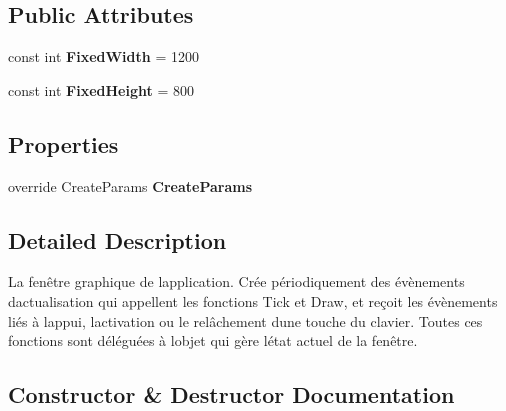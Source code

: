 \subsection*{Public Attributes}
\begin{DoxyCompactItemize}
\item 
\mbox{\label{class_tentacle_slicers_1_1windows_1_1_main_form_ab91dcc09042e3feeda5bb70bb30553cf}} 
const int {\bfseries Fixed\+Width} = 1200
\item 
\mbox{\label{class_tentacle_slicers_1_1windows_1_1_main_form_a17bfd59f0e3f706323167eb00a667b6b}} 
const int {\bfseries Fixed\+Height} = 800
\end{DoxyCompactItemize}
\subsection*{Properties}
\begin{DoxyCompactItemize}
\item 
\mbox{\label{class_tentacle_slicers_1_1windows_1_1_main_form_a946c579e3ec78c9abcd501044e09f35d}} 
override Create\+Params {\bfseries Create\+Params}
\end{DoxyCompactItemize}


\subsection{Detailed Description}
La fenêtre graphique de l\textquotesingle{}application. Crée périodiquement des évènements d\textquotesingle{}actualisation qui appellent les fonctions Tick et Draw, et reçoit les évènements liés à l\textquotesingle{}appui, l\textquotesingle{}activation ou le relâchement d\textquotesingle{}une touche du clavier. Toutes ces fonctions sont déléguées à l\textquotesingle{}objet qui gère l\textquotesingle{}état actuel de la fenêtre. 



\subsection{Constructor \& Destructor Documentation}
\mbox{\label{class_tentacle_slicers_1_1windows_1_1_main_form_ab26b07ac69e8660776a2215b15c9e3af}} 
